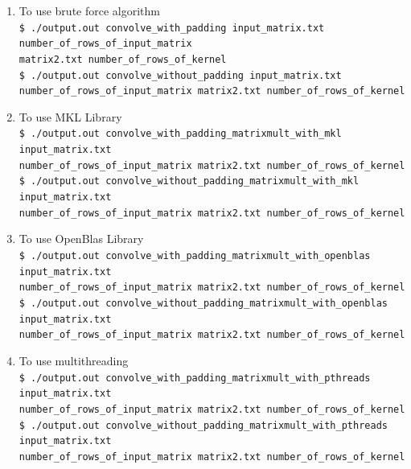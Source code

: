 \documentclass{article}
\begin{document}
\begin{enumerate}
    \item To use brute force algorithm\\
    \texttt{\$ ./output.out convolve\_with\_padding input\_matrix.txt number\_of\_rows\_of\_input\_matrix \\matrix2.txt number\_of\_rows\_of\_kernel}\\
    \texttt{\$ ./output.out convolve\_without\_padding input\_matrix.txt number\_of\_rows\_of\_input\_matrix matrix2.txt number\_of\_rows\_of\_kernel}
    
    \item To use MKL Library\\
    \texttt{\$ ./output.out convolve\_with\_padding\_matrixmult\_with\_mkl input\_matrix.txt\\ number\_of\_rows\_of\_input\_matrix matrix2.txt number\_of\_rows\_of\_kernel}\\
    \texttt{\$ ./output.out convolve\_without\_padding\_matrixmult\_with\_mkl input\_matrix.txt\\ number\_of\_rows\_of\_input\_matrix matrix2.txt number\_of\_rows\_of\_kernel}\\
    
    \item To use OpenBlas Library\\
    \texttt{\$ ./output.out convolve\_with\_padding\_matrixmult\_with\_openblas input\_matrix.txt\\ number\_of\_rows\_of\_input\_matrix matrix2.txt number\_of\_rows\_of\_kernel}\\
    \texttt{\$ ./output.out convolve\_without\_padding\_matrixmult\_with\_openblas input\_matrix.txt\\ number\_of\_rows\_of\_input\_matrix matrix2.txt number\_of\_rows\_of\_kernel}\\
    
    \item To use multithreading\\
    \texttt{\$ ./output.out convolve\_with\_padding\_matrixmult\_with\_pthreads input\_matrix.txt\\ number\_of\_rows\_of\_input\_matrix matrix2.txt number\_of\_rows\_of\_kernel}\\
    \texttt{\$ ./output.out convolve\_without\_padding\_matrixmult\_with\_pthreads input\_matrix.txt\\ number\_of\_rows\_of\_input\_matrix matrix2.txt number\_of\_rows\_of\_kernel}\\
    
\end{enumerate}
\end{document}

